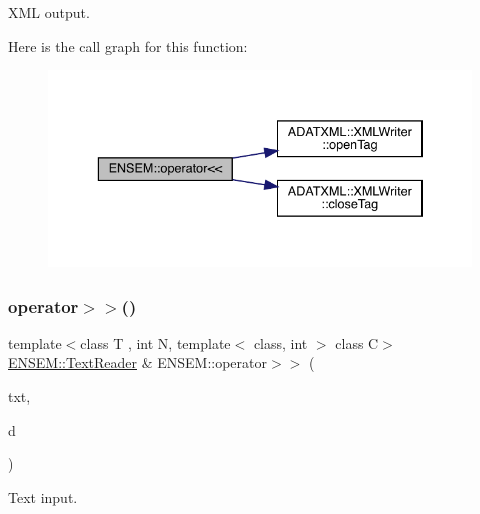 X\+ML output. 

Here is the call graph for this function\+:\nopagebreak
\begin{figure}[H]
\begin{center}
\leavevmode
\includegraphics[width=336pt]{df/d0a/group__primmatrix_ga88162a3095bbb5b40ba8100093befe2b_cgraph}
\end{center}
\end{figure}
\mbox{\label{group__primmatrix_ga94a915150324a06d2d330515358811f2}} 
\subsubsection{\texorpdfstring{operator$>$$>$()}{operator>>()}}
{\footnotesize\ttfamily template$<$class T , int N, template$<$ class, int $>$ class C$>$ \\
\mbox{\hyperlink{classENSEM_1_1TextReader}{E\+N\+S\+E\+M\+::\+Text\+Reader}} \& E\+N\+S\+E\+M\+::operator$>$$>$ (\begin{DoxyParamCaption}\item[{\mbox{\hyperlink{classENSEM_1_1TextReader}{E\+N\+S\+E\+M\+::\+Text\+Reader}} \&}]{txt,  }\item[{\mbox{\hyperlink{classENSEM_1_1PMatrix}{P\+Matrix}}$<$ T, \mbox{\hyperlink{operator__name__util_8cc_a7722c8ecbb62d99aee7ce68b1752f337}{N}}, C $>$ \&}]{d }\end{DoxyParamCaption})\hspace{0.3cm}{\ttfamily [inline]}}



Text input. 

\mbox{\label{group__primmatrix_ga95fe2504ecc461173cb780afe6dbbbf4}} 
